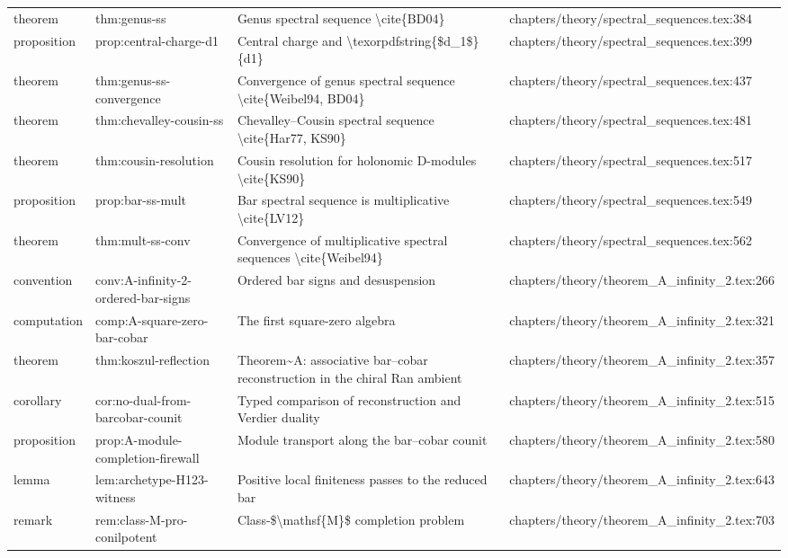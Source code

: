\documentclass[11pt]{article}
\begin{document}
\begin{longtable}{L{0.10\textwidth}L{0.26\textwidth}L{0.42\textwidth}L{0.22\textwidth}}
theorem & thm:genus-ss & Genus spectral sequence \textbackslash{}cite\{BD04\} & chapters/theory/spectral\_sequences.tex:384\\
proposition & prop:central-charge-d1 & Central charge and \textbackslash{}texorpdfstring\{\$d\_1\$\}\{d1\} & chapters/theory/spectral\_sequences.tex:399\\
theorem & thm:genus-ss-convergence & Convergence of genus spectral sequence \textbackslash{}cite\{Weibel94, BD04\} & chapters/theory/spectral\_sequences.tex:437\\
theorem & thm:chevalley-cousin-ss & Chevalley--Cousin spectral sequence \textbackslash{}cite\{Har77, KS90\} & chapters/theory/spectral\_sequences.tex:481\\
theorem & thm:cousin-resolution & Cousin resolution for holonomic D-modules \textbackslash{}cite\{KS90\} & chapters/theory/spectral\_sequences.tex:517\\
proposition & prop:bar-ss-mult & Bar spectral sequence is multiplicative \textbackslash{}cite\{LV12\} & chapters/theory/spectral\_sequences.tex:549\\
theorem & thm:mult-ss-conv & Convergence of multiplicative spectral sequences \textbackslash{}cite\{Weibel94\} & chapters/theory/spectral\_sequences.tex:562\\
convention & conv:A-infinity-2-ordered-bar-signs & Ordered bar signs and desuspension & chapters/theory/theorem\_A\_infinity\_2.tex:266\\
computation & comp:A-square-zero-bar-cobar & The first square-zero algebra & chapters/theory/theorem\_A\_infinity\_2.tex:321\\
theorem & thm:koszul-reflection & Theorem\textasciitilde{}A: associative bar--cobar reconstruction in the chiral Ran ambient & chapters/theory/theorem\_A\_infinity\_2.tex:357\\
corollary & cor:no-dual-from-barcobar-counit & Typed comparison of reconstruction and Verdier duality & chapters/theory/theorem\_A\_infinity\_2.tex:515\\
proposition & prop:A-module-completion-firewall & Module transport along the bar--cobar counit & chapters/theory/theorem\_A\_infinity\_2.tex:580\\
lemma & lem:archetype-H123-witness & Positive local finiteness passes to the reduced bar & chapters/theory/theorem\_A\_infinity\_2.tex:643\\
remark & rem:class-M-pro-conilpotent & Class-\$\textbackslash{}mathsf\{M\}\$ completion problem & chapters/theory/theorem\_A\_infinity\_2.tex:703\\

\end{longtable}
\end{document}

